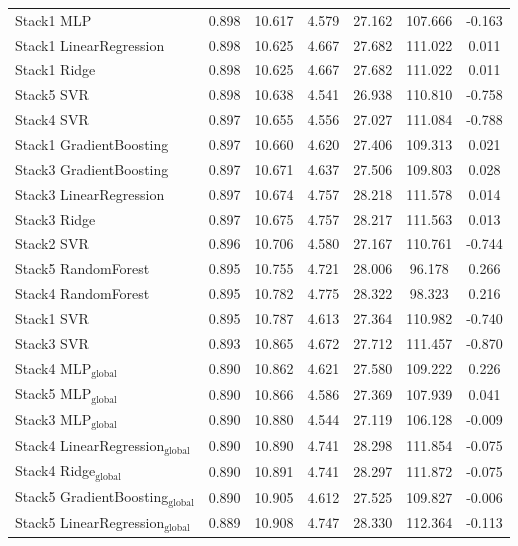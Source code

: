 \documentclass[a4paper,twocolumn]{article}
\begin{document}
\begin{table}
{\begin{tabular}{p{4.5cm}cccccc}
        Stack1 MLP & 0.898 & 10.617 & 4.579 & 27.162 & 107.666 & -0.163 \\
        Stack1 LinearRegression & 0.898 & 10.625 & 4.667 & 27.682 & 111.022 & 0.011 \\
        Stack1 Ridge & 0.898 & 10.625 & 4.667 & 27.682 & 111.022 & 0.011 \\
        Stack5 SVR & 0.898 & 10.638 & 4.541 & 26.938 & 110.810 & -0.758 \\
        Stack4 SVR & 0.897 & 10.655 & 4.556 & 27.027 & 111.084 & -0.788 \\
        Stack1 GradientBoosting & 0.897 & 10.660 & 4.620 & 27.406 & 109.313 & 0.021 \\
        Stack3 GradientBoosting & 0.897 & 10.671 & 4.637 & 27.506 & 109.803 & 0.028 \\
        Stack3 LinearRegression & 0.897 & 10.674 & 4.757 & 28.218 & 111.578 & 0.014 \\
        Stack3 Ridge & 0.897 & 10.675 & 4.757 & 28.217 & 111.563 & 0.013 \\
        Stack2 SVR & 0.896 & 10.706 & 4.580 & 27.167 & 110.761 & -0.744 \\
        Stack5 RandomForest & 0.895 & 10.755 & 4.721 & 28.006 & 96.178 & 0.266 \\
        Stack4 RandomForest & 0.895 & 10.782 & 4.775 & 28.322 & 98.323 & 0.216 \\
        Stack1 SVR & 0.895 & 10.787 & 4.613 & 27.364 & 110.982 & -0.740 \\
        Stack3 SVR & 0.893 & 10.865 & 4.672 & 27.712 & 111.457 & -0.870 \\
        Stack4 MLP$_{\text{global}}$ & 0.890 & 10.862 & 4.621 & 27.580 & 109.222 & 0.226 \\
        Stack5 MLP$_{\text{global}}$ & 0.890 & 10.866 & 4.586 & 27.369 & 107.939 & 0.041 \\
        Stack3 MLP$_{\text{global}}$ & 0.890 & 10.880 & 4.544 & 27.119 & 106.128 & -0.009 \\
        Stack4 LinearRegression$_{\text{global}}$ & 0.890 & 10.890 & 4.741 & 28.298 & 111.854 & -0.075 \\
        Stack4 Ridge$_{\text{global}}$ & 0.890 & 10.891 & 4.741 & 28.297 & 111.872 & -0.075 \\
        Stack5 GradientBoosting$_{\text{global}}$ & 0.890 & 10.905 & 4.612 & 27.525 & 109.827 & -0.006 \\
        Stack5 LinearRegression$_{\text{global}}$ & 0.889 & 10.908 & 4.747 & 28.330 & 112.364 & -0.113 \\

\end{tabular}}
\end{table}
\end{document}
